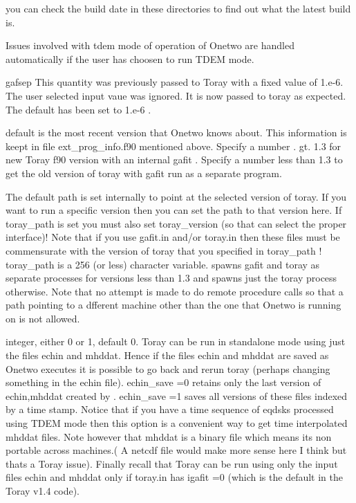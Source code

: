 \documentclass[12pt]{article}
\begin{document}
         you can check the build  date in these directories to find out
         what the latest build is.
 

         Issues involved with tdem mode
         of operation of Onetwo are handled automatically if the user
         has choosen to run  TDEM mode.
 
     \begin{description}
       \item {gafsep}  This quantity was previously passed to Toray
         with a fixed value of 1.e-6. The user selected input vaue was
         ignored. It is now passed to toray as expected. The default
         has been set to 1.e-6 .
       \item [toray\_version]  default is the  most recent
         version that Onetwo knows about. This information is keept in
         file ext\_prog\_info.f90 mentioned above. Specify a
         number . gt. 1.3 for new Toray f90 version with an internal
         gafit . Specify a 
         number less than 1.3  to get the old version of toray with
         gafit run as a separate program.
       \item [toray\_path]  The default path is set internally to
         point at the selected version of toray. If you  want to run a
         specific version then you can set the path to that version
         here. If toray\_path is set you  must also set
         toray\_version  (so that \ot can select the proper interface)!
         Note that if you use gafit.in and/or toray.in then these
         files must be commensurate with the version of toray
         that you specified in toray\_path !
         toray\_path is a 256 (or less) character variable. 
         \ot  spawns gafit and toray as separate processes for
          versions less than 1.3 and spawns just the toray
          process otherwise. Note that no attempt is made to do
          remote procedure calls so that a path pointing
          to a dfferent machine other than the one that Onetwo is
          running on is not allowed. 
       \item [echin\_save]  integer, either 0 or 1, default 0. 
         Toray can be run in
         standalone mode using just the files echin and mhddat. Hence
         if the files echin and mhddat  are saved as Onetwo executes it is
         possible to go back and rerun toray (perhaps changing 
         something in the echin file). echin\_save  =0 retains only the
         last version of echin,mhddat created by \ot. echin\_save =1 saves
         all versions of these files indexed by a time stamp. Notice
         that if you have a time sequence of eqdsks processed using
         TDEM  mode then this option is a convenient way to get time
         interpolated mhddat files. Note however that mhddat is a
         binary file which means its non portable across
         machines.( A netcdf file would make more sense here I think
         but thats a Toray issue). Finally recall that
         Toray can be run using only the input files echin and mhddat
         only if toray.in has igafit =0 (which is the default in the
         Toray v1.4  code).

     \end{description}
\end{document}
